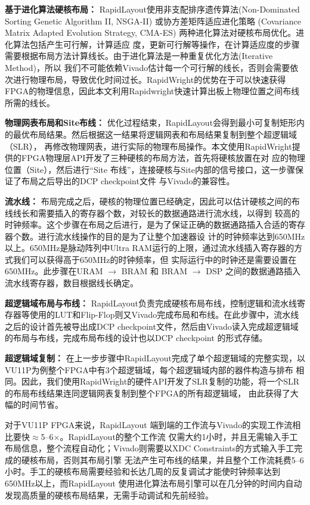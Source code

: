 {\bf 基于进化算法硬核布局：}
RapidLayout使用非支配排序遗传算法(Non-Dominated Sorting Genetic Algorithm II, NSGA-II) 或协方差矩阵适应进化策略
(Covariance Matrix Adapted Evolution Strategy, CMA-ES) 两种进化算法对硬核布局优化。进化算法包括产生可行解，计算适应
度，更新可行解等操作，在计算适应度的步骤需要根据布局方法计算线长。由于进化算法是一种重复优化方法(Iterative Method)，所以
我们不可能依赖Vivado估计每一个可行解的线长，否则会需要依次进行物理布局，导致优化时间过长。RapidWright的优势在于可以快速获得
FPGA的物理信息，因此本文利用Rapidwright快速计算出板上物理位置之间布线所需的线长。

 {\bf 物理网表布局和Site布线：}
优化过程结束，RapidLayout会得到最小可复制矩形内的最优布局结果。然后根据这一结果将逻辑网表和布局结果复制到整个超逻辑域（SLR），
再修改物理网表，进行实际的物理布局操作。本文使用RapidWright提供的FPGA物理层API开发了三种硬核的布局方法，首先将硬核放置在对
应的物理位置（Site），然后进行“Site 布线”，连接硬核与Site内部的信号接口，这一步骤保证了布局之后导出的DCP checkpoint文件
与Vivado的兼容性。

 {\bf 流水线：}
布局完成之后，硬核的物理位置已经确定，因此可以估计硬核之间的布线线长和需要插入的寄存器个数，对较长的数据通路进行流水线，以得到
较高的时钟频率。这个步骤在布局之后进行，是为了保证正确的数据通路插入合适的寄存器个数。进行流水线操作的目的是为了让整个加速器设
计的时钟频率达到650MHz以上。650MHz是脉动阵列中Ultra RAM运行的上限，通过流水线插入寄存器的方式我们可以获得高于650MHz的时钟频率，但
实际运行中的时钟还是需要设置在650MHz。此步骤在URAM $\rightarrow$ BRAM 和 BRAM $\rightarrow$ DSP 之间的数据通路插入
流水线寄存器，数目根据线长确定。

 {\bf 超逻辑域布局与布线：}
RapidLayout负责完成硬核布局布线，控制逻辑和流水线寄存器等使用的LUT和Flip-Flop则又Vivado完成布局和布线。在此步骤中，流水线
之后的设计首先被导出成DCP checkpoint文件，然后由Vivado读入完成超逻辑域的布局与布线，完成布局布线的设计也以DCP checkpoint
的形式存储。

 {\bf 超逻辑域复制：}
在上一步步骤中RapidLayout完成了单个超逻辑域的完整实现，以VU11P为例整个FPGA中有3个超逻辑域，每个超逻辑域内部的器件构造与排布
相同。因此，我们使用RapidWright的硬件API开发了SLR复制的功能，将一个SLR的布局布线结果连同逻辑网表复制到整个FPGA的所有超逻辑域，
由此获得了大幅的时间节省。

对于VU11P FPGA来说，RapidLayout 端到端的工作流与Vivado的实现工作流相比要快$\approx$5--6$\times$。RapidLayout的整个工作流
仅需大约1小时，并且无需输入手工布局信息，整个流程自动化；Vivado则需要以XDC Constraints的方式输入手工完成的硬核布局，否则其布局引擎
无法产生可布线的结果，并且整个工作流耗费5--6小时。手工的硬核布局需要经验和长达几周的反复调试才能使时钟频率达到650MHz以上，而RapidLayout
使用进化算法布局引擎可以在几分钟的时间内自动发现高质量的硬核布局结果，无需手动调试和先前经验。


